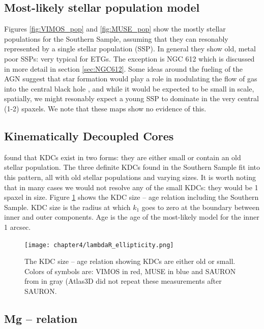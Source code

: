 	\subsection{Most-likely stellar population model}
		Figures \ref{fig:VIMOS_pop} and \ref{fig:MUSE_pop} show the mostly stellar populations for the Southern Sample, assuming that they can resonably represented by a single stellar population (SSP). In general they show old, metal poor SSPs: very typical for ETGs. The exception is NGC 612 which is discussed in more detail in section \ref{sec:NGC612}. Some ideas around the fueling of the AGN suggest that star formation would play a role in modulating the flow of gas into the central black hole \citep{}, and while it would be expected to be small in scale, spatially, we might resonably expect a young SSP to dominate in the very central (1-2) spaxels. We note that these maps show no evidence of this. 


	\subsection{Kinematically Decoupled Cores}
		\label{sec:popKDC}

		\citet{Kuntschner2010} found that KDCs exist in two forms: they are either small or contain an old stellar population. The three definite KDCs found in the Southern Sample fit into this pattern, all with old stellar populations and varying sizes. It is worth noting that in many cases we would not resolve any of the small KDCs: they would be 1 spaxel in size. Figure \ref{fig:KDC} shows the KDC size -- age relation including the Southern Sample. KDC size is the radius at which $k_1$ goes to zero at the boundary between inner and outer components. Age is the age of the most-likely model for the inner 1 arcsec. 

		\begin{figure}
			\centering
			\texttt{[image: chapter4/lambdaR\_ellipticity.png]}
			\caption[KDC dichotomy]{The KDC size -- age relation showing KDCs are either old or small. Colors of symbols are: VIMOS in red, MUSE in blue and SAURON from \citet{Kuntschner2010} in gray (Atlas3D did not repeat these measurements after SAURON.}
			\label{fig:KDC}
		\end{figure}


	\subsection{Mg -- \textsigma relation}
		\label{subsec:Mgsigma}

